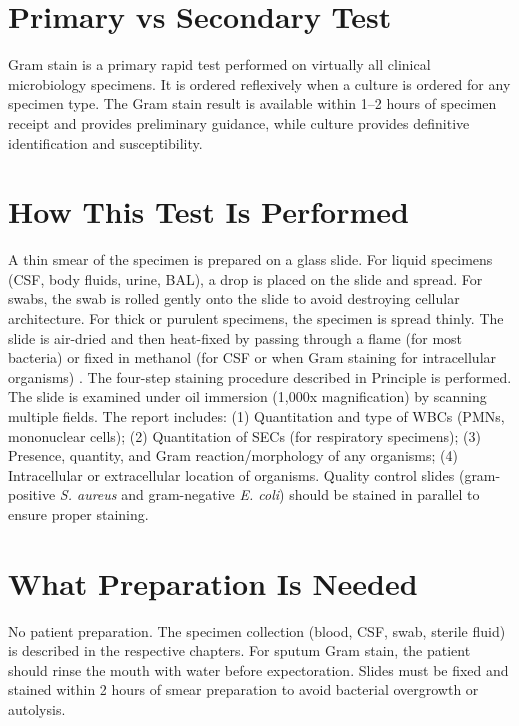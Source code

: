 \section*{Primary vs Secondary Test}
Gram stain is a primary rapid test performed on virtually all clinical microbiology specimens. It is ordered reflexively when a culture is ordered for any specimen type. The Gram stain result is available within 1--2 hours of specimen receipt and provides preliminary guidance, while culture provides definitive identification and susceptibility.

\section*{How This Test Is Performed}
A thin smear of the specimen is prepared on a glass slide. For liquid specimens (CSF, body fluids, urine, BAL), a drop is placed on the slide and spread. For swabs, the swab is rolled gently onto the slide to avoid destroying cellular architecture. For thick or purulent specimens, the specimen is spread thinly. The slide is air-dried and then heat-fixed by passing through a flame (for most bacteria) or fixed in methanol (for CSF or when Gram staining for intracellular organisms) \cite{thomson2019specimen}. The four-step staining procedure described in Principle is performed. The slide is examined under oil immersion (1,000x magnification) by scanning multiple fields. The report includes: (1) Quantitation and type of WBCs (PMNs, mononuclear cells); (2) Quantitation of SECs (for respiratory specimens); (3) Presence, quantity, and Gram reaction/morphology of any organisms; (4) Intracellular or extracellular location of organisms. Quality control slides (gram-positive \textit{S. aureus} and gram-negative \textit{E. coli}) should be stained in parallel to ensure proper staining.

\section*{What Preparation Is Needed}
No patient preparation. The specimen collection (blood, CSF, swab, sterile fluid) is described in the respective chapters. For sputum Gram stain, the patient should rinse the mouth with water before expectoration. Slides must be fixed and stained within 2 hours of smear preparation to avoid bacterial overgrowth or autolysis.

